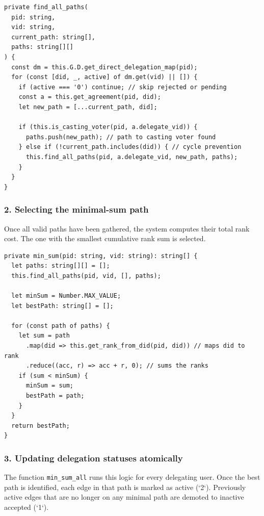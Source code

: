 \begin{verbatim}
private find_all_paths(
  pid: string,
  vid: string,
  current_path: string[],
  paths: string[][]
) {
  const dm = this.G.D.get_direct_delegation_map(pid);
  for (const [did, _, active] of dm.get(vid) || []) {
    if (active === '0') continue; // skip rejected or pending
    const a = this.get_agreement(pid, did);
    let new_path = [...current_path, did];

    if (this.is_casting_voter(pid, a.delegate_vid)) {
      paths.push(new_path); // path to casting voter found
    } else if (!current_path.includes(did)) { // cycle prevention
      this.find_all_paths(pid, a.delegate_vid, new_path, paths);
    }
  }
}
\end{verbatim}

\subsubsection*{2. Selecting the minimal-sum path}

Once all valid paths have been gathered, the system computes their total rank cost. The one with the smallest cumulative rank sum is selected.

\begin{verbatim}
private min_sum(pid: string, vid: string): string[] {
  let paths: string[][] = [];
  this.find_all_paths(pid, vid, [], paths);

  let minSum = Number.MAX_VALUE;
  let bestPath: string[] = [];

  for (const path of paths) {
    let sum = path
      .map(did => this.get_rank_from_did(pid, did)) // maps did to rank
      .reduce((acc, r) => acc + r, 0); // sums the ranks
    if (sum < minSum) {
      minSum = sum;
      bestPath = path;
    }
  }
  return bestPath;
}
\end{verbatim}

\subsubsection*{3. Updating delegation statuses atomically}

The function \texttt{min\_sum\_all} runs this logic for every delegating user. Once the best path is identified, each edge in that path is marked as active (`2`). Previously active edges that are no longer on any minimal path are demoted to inactive accepted (`1`).


